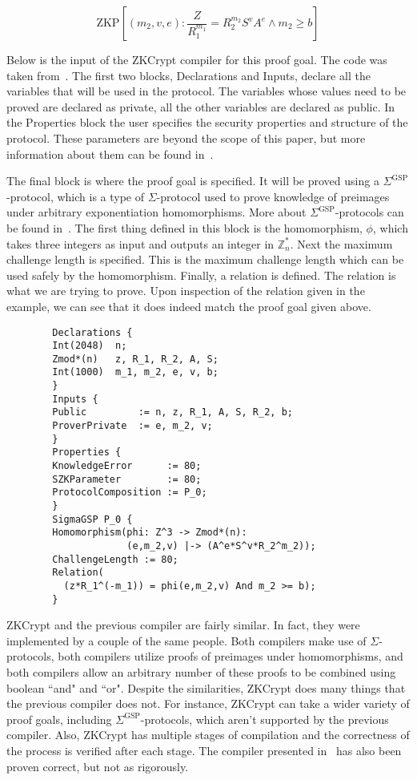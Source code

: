 \documentclass{sig-alternate}
\begin{document}
		\begin{equation*}
		\text{ZKP}[(m_{2}, v, e): \frac{Z}{R^{m_{1}}_{1}} = R^{m_{2}}_{2}S^{v}A^{e} \land m_{2} \ge b]
		\end{equation*}
		
		Below is the input of the ZKCrypt compiler for this proof goal. The code was taken
		from~\cite{ZKCrypt:2012}. The first two blocks, Declarations and Inputs, declare 
		all the variables that will be used in the protocol. The variables whose values
		need to be proved are declared as private, all the other variables are declared as
		public. In the Properties block the user specifies the security properties and
		structure of the protocol. These parameters are beyond the scope of this paper, but
		more information about them can be found in~\cite{ZKCrypt:2012}. 
		
		The final block is 	where the proof goal is specified. It will be proved using a
		$\Sigma^{\textrm{GSP}}$-protocol, which is a type of $\Sigma$-protocol used to prove
		knowledge of preimages under arbitrary exponentiation homomorphisms. More about 
		$\Sigma^{\textrm{GSP}}$-protocols can be found in~\cite{ZKCrypt:2012}.
		The first thing defined in this block is the homomorphism, $\phi$, which takes
		three integers as input and outputs an integer in $\mathbb{Z}^{*}_{n}$. Next the
		maximum challenge length is specified. This is the maximum challenge length which can
		be used safely by the homomorphism. Finally, a relation is defined. The relation
		is what we are trying to prove. Upon inspection of the relation given in the example,
		we can see that it does indeed match the proof goal given above.
				
		\begin{verbatim}
		Declarations {
		Int(2048)  n;
		Zmod*(n)   z, R_1, R_2, A, S;
		Int(1000)  m_1, m_2, e, v, b;
		}
		Inputs {
		Public         := n, z, R_1, A, S, R_2, b;
		ProverPrivate  := e, m_2, v;
		}
		Properties {
		KnowledgeError		:= 80;
		SZKParameter		:= 80;
		ProtocolComposition := P_0;
		}
		SigmaGSP P_0 {
		Homomorphism(phi: Z^3 -> Zmod*(n):
					 (e,m_2,v) |-> (A^e*S^v*R_2^m_2));
		ChallengeLength := 80;
		Relation(
		  (z*R_1^(-m_1)) = phi(e,m_2,v) And m_2 >= b);
		}
		\end{verbatim}
		
		ZKCrypt and the previous compiler are fairly similar. In fact, they were implemented
		by a couple of the same people. Both compilers make use of $\Sigma$-protocols, both
		compilers utilize proofs of preimages under homomorphisms, and both compilers allow
		an arbitrary number of these proofs to be combined using boolean ``and" and ``or".
		Despite the similarities, ZKCrypt does many things that the previous compiler does
		not. For instance, ZKCrypt can take a wider variety of proof goals, including
		$\Sigma^{\textrm{GSP}}$-protocols, which aren't supported by the previous compiler.
		Also, ZKCrypt has multiple stages of compilation and the correctness
		of the process is verified after each stage. The compiler presented in~\cite{Sigma:2009}
		has also been proven correct, but not as rigorously.
				
\end{document}
